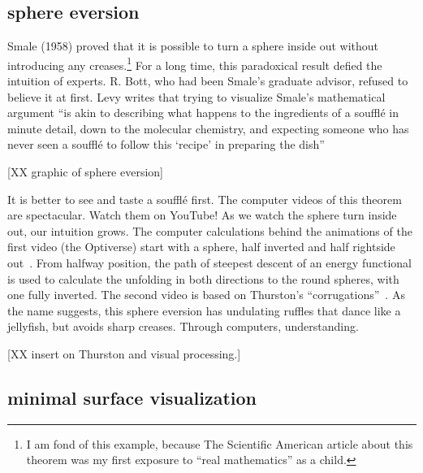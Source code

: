 \documentclass{llncs}
\begin{document}
\subsection{sphere eversion}







Smale (1958) proved that it is possible to turn a sphere inside out
without introducing any creases.\footnote{I am fond of this example,
because The Scientific American
  article \cite{Phi66} about this theorem was my first exposure to ``real
  mathematics'' as a child.}  For a long time, this paradoxical result
defied the intuition of experts.  R. Bott, who had been Smale's
graduate advisor, refused to believe it at first.  Levy writes that
trying to visualize Smale's mathematical argument ``is akin to
describing what happens to the ingredients of a souffl\'e in minute
detail, down to the molecular chemistry, and expecting someone who has
never seen a souffl\'e to follow this `recipe' in preparing the
dish''~\cite{Le95}

[XX graphic of sphere eversion]

It is better to see and taste a souffl\'e first.  The computer videos
of this theorem are spectacular.  Watch them on YouTube!  As we watch
the sphere turn inside out, our intuition grows.  The computer
calculations behind the animations of the first video (the Optiverse)
start with a sphere, half inverted and half rightside out~\cite{SFL}.  From
halfway position, the path of steepest descent of an energy functional is
used to calculate the unfolding in both directions to the round spheres,
with one fully inverted.  The second video is based on Thurston's
``corrugations''~\cite{LMM}. As the name suggests, this sphere eversion has
undulating ruffles that dance like a jellyfish, but avoids sharp
creases.   Through computers, understanding.

[XX insert on Thurston and visual processing.]

\subsection{minimal surface visualization} %
\end{document}
